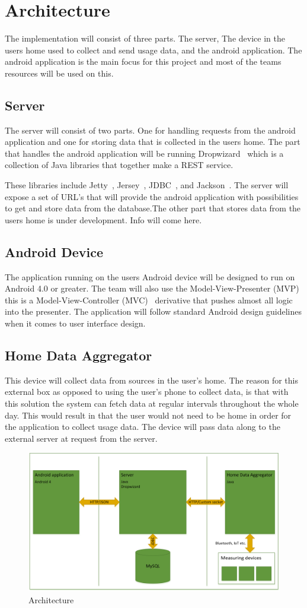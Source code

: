 \newpage
\section{Architecture}
The implementation will consist of three parts. The server, The device in the users home used to 
collect and send usage data, and the android application. The android application is the main focus for 
this project and most of the teams resources will be used on this.

\subsection{Server}
The server will consist of two parts. One for handling requests from the android application and one for storing data that is collected in the users home. 
The part that handles the android application will be running Dropwizard~\cite{dropwizard} which is a collection of Java libraries that together make a REST service. 

These libraries include Jetty~\cite{jetty}, Jersey~\cite{jersey}, JDBC~\cite{jdbc}, and Jackson~\cite{jackson}. The server will expose a set of URL’s that will provide the android application with 
possibilities to get and store data from the database.The other part that stores data from the users home is under development. Info will come here.

\subsection{Android Device}
The application running on the users Android device will be designed to run on Android 4.0 or greater.
The team will also use the Model-View-Presenter (MVP)~\cite{mvp} this is a Model-View-Controller (MVC)~\cite{mvc} derivative 
that pushes almost all logic into the presenter. The application will follow standard Android design guidelines 
when it comes to user interface design.

\subsection{Home Data Aggregator}
This device will collect data from sources in the user's home. The reason for this external box as opposed to using 
the user's phone to collect data, is that with this solution the system can fetch data at regular intervals throughout 
the whole day. This would result in that the user would not need to be home in order for the application to collect 
usage data. The device will pass data along to the external server at request from the server.

\begin{figure}[H]
\includegraphics[width=\textwidth]{ch/planning/fig/architecture.png}
\caption{Architecture}
\end{figure}
